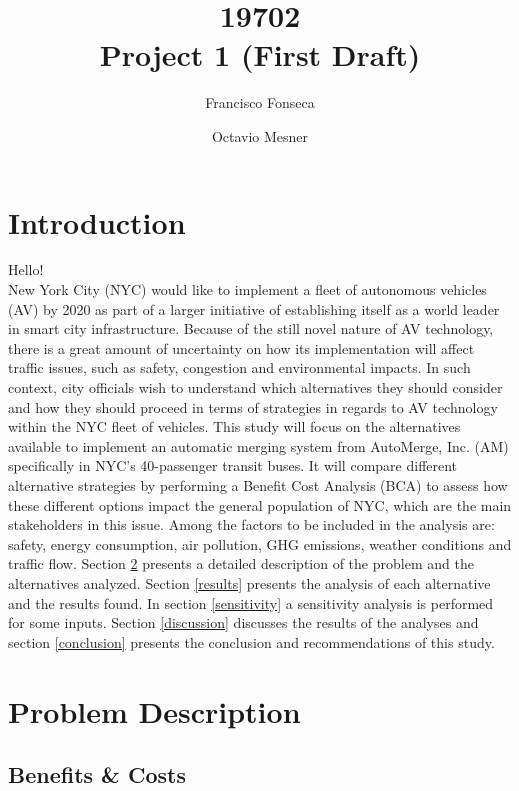\documentclass[11pt, letterpaper]{article}
\title{\vspace{-2cm} 19702 \\ Project 1 (First Draft)}
\author{Francisco Fonseca \and Octavio Mesner}
\date{\mydate}
\date{\mydateformat\normalsize\mydate} %
\begin{document}
\maketitle %

\section{Introduction} \label{intro}

Hello!\\

New York City (NYC) would like to implement a fleet of autonomous
vehicles (AV) by 2020 as part of a larger initiative of establishing
itself as a world leader in smart city infrastructure. Because of the
still novel nature of AV technology, there is a great amount of
uncertainty on how its implementation will affect traffic issues, such
as safety, congestion and environmental impacts. In such context, city
officials wish to understand which alternatives they should consider
and how they should proceed in terms of strategies in regards to AV
technology within the NYC fleet of vehicles. This study will focus on
the alternatives available to implement an automatic merging system
from AutoMerge, Inc. (AM) specifically in NYC's 40-passenger transit
buses. It will compare different alternative strategies by performing
a Benefit Cost Analysis (BCA) to assess how these different options
impact the general population of NYC, which are the main stakeholders
in this issue. Among the factors to be included in the analysis are:
safety, energy consumption, air pollution, GHG emissions, weather
conditions and traffic flow. Section \ref{problem} presents a detailed
description of the problem and the alternatives analyzed. Section
\ref{results} presents the analysis of each alternative and the
results found. In section \ref{sensitivity} a sensitivity analysis is
performed for some inputs. Section \ref{discussion} discusses the
results of the analyses and section \ref{conclusion} presents the
conclusion and recommendations of this study.

\section{Problem Description} \label{problem}

\subsection{Benefits \& Costs}
\end{document}
